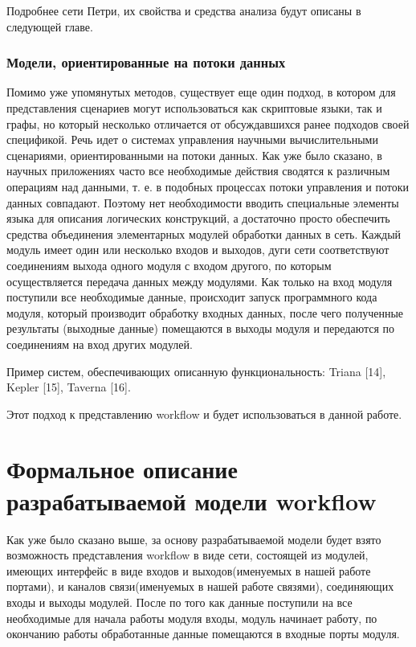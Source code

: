 \documentclass[a4paper,12pt]{article}
\begin{document}
Подробнее сети Петри, их свойства и средства анализа будут описаны в следующей главе.

\subsubsection{Модели, ориентированные на потоки данных}
Помимо уже упомянутых методов, существует еще один подход, в котором для представления сценариев могут использоваться как скриптовые
языки, так и графы, но который несколько отличается от обсуждавшихся
ранее подходов своей спецификой.
Речь идет о системах управления научными вычислительными сценариями, ориентированными на потоки данных. Как уже было сказано,
в научных приложениях часто все необходимые действия сводятся к различным операциям над данными, т. е. в подобных процессах потоки
управления и потоки данных совпадают. Поэтому нет необходимости вводить специальные элементы языка для описания логических конструкций, а достаточно просто обеспечить средства объединения элементарных модулей обработки данных в сеть. Каждый модуль имеет один или несколько входов и выходов, дуги сети соответствуют соединениям выхода одного
модуля с входом другого, по которым осуществляется передача данных
между модулями. Как только на вход модуля поступили все необходимые данные, происходит запуск программного кода модуля, который производит обработку входных данных, после чего полученные результаты (выходные данные) помещаются в выходы модуля и передаются по соединениям на вход других модулей. 


Пример систем, обеспечивающих описанную функциональность: Triana [14], Kepler [15], Taverna [16].

Этот подход к представлению workflow и будет использоваться в данной работе.

\section{Формальное описание разрабатываемой модели workflow}
Как уже было сказано выше, за основу разрабатываемой модели будет взято возможность представления workflow в виде сети, состоящей из модулей, имеющих интерфейс в виде входов и выходов(именуемых в нашей работе портами), и каналов связи(именуемых в нашей работе связями), соединяющих входы и выходы модулей. После по того как данные поступили на все необходимые для начала работы модуля входы, модуль начинает работу, по окончанию работы обработанные данные помещаются в входные порты модуля.\\
\end{document}
